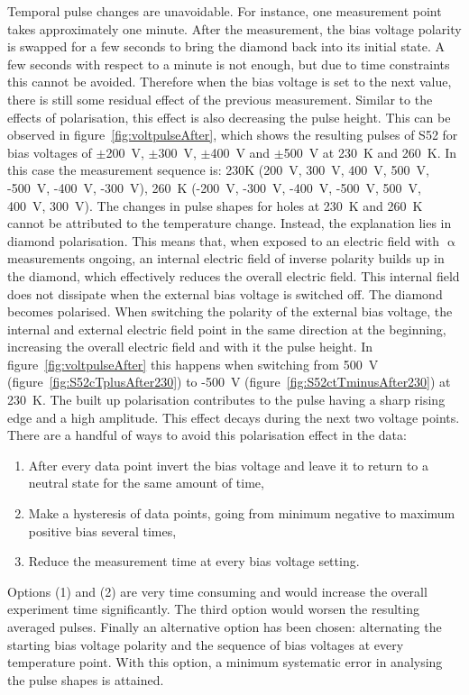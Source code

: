 Temporal pulse changes are unavoidable. For instance, one measurement point takes approximately one minute. After the measurement, the bias voltage polarity is swapped for a few seconds to bring the diamond back into its initial state. A few seconds with respect to a minute is not enough, but due to time constraints this cannot be avoided. Therefore when the bias voltage is set to the next value, there is still some residual effect of the previous measurement. Similar to the effects of polarisation, this effect is also decreasing the pulse height. This can be observed in figure~\ref{fig:voltpulseAfter}, which shows the resulting pulses of S52 for bias voltages of $\pm$200~V, $\pm$300~V, $\pm$400~V and $\pm$500~V at 230~K and 260~K. In this case the measurement sequence is: 230K (200~V, 300~V, 400~V, 500~V, -500~V, -400~V, -300~V), 260~K (-200~V, -300~V, -400~V, -500~V, 500~V, 400~V, 300~V). The changes in pulse shapes for holes at 230~K and 260~K cannot be attributed to the temperature change. Instead, the explanation lies in diamond polarisation. This means that, when exposed to an electric field with $\upalpha$ measurements ongoing, an internal electric field of inverse polarity builds up in the diamond, which effectively reduces the overall electric field. This internal field does not dissipate when the external bias voltage is switched off. The diamond becomes polarised. When switching the polarity of the external bias voltage, the internal and external electric field point in the same direction at the beginning, increasing the overall electric field and with it the pulse height. In figure~\ref{fig:voltpulseAfter} this happens when switching from 500~V (figure~\ref{fig:S52cTplusAfter230}) to -500~V (figure~\ref{fig:S52ctTminusAfter230}) at 230~K. The built up polarisation contributes to the pulse having a sharp rising edge and a high amplitude. This effect decays during the next two voltage points. There are a handful of ways to avoid this polarisation effect in the data: 

\begin{enumerate}[itemsep=0.1\baselineskip]
\item After every data point invert the bias voltage and leave it to return to a neutral state for the same amount of time, 
\item Make a hysteresis of data points, going from minimum negative to maximum positive bias several times, 
\item Reduce the measurement time at every bias voltage setting.
\end{enumerate}
Options (1) and (2) are very time consuming and would increase the overall experiment time significantly. The third option would worsen the resulting averaged pulses. Finally an alternative option has been chosen: alternating the starting bias voltage polarity and the sequence of bias voltages at every temperature point. With this option, a minimum systematic error in analysing the pulse shapes is attained.




